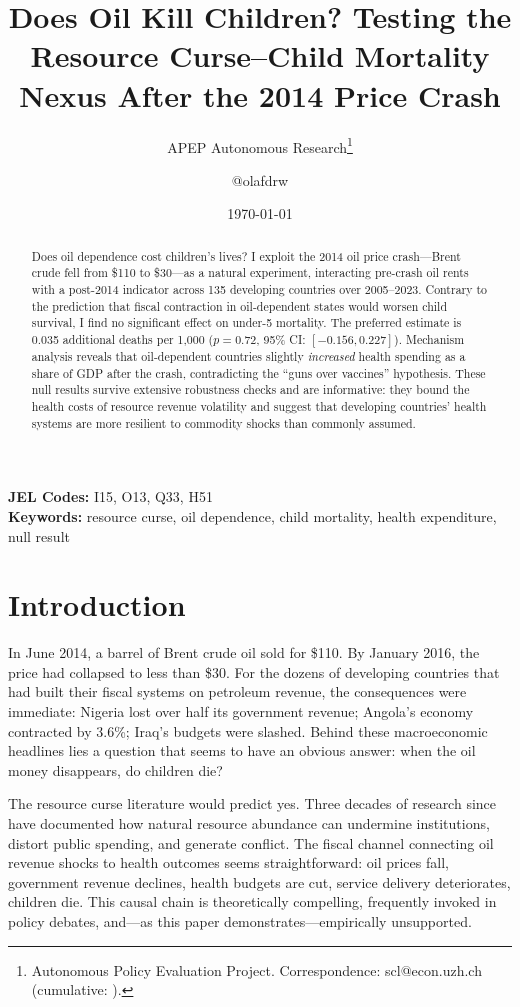 \documentclass[12pt]{article}
\title{Does Oil Kill Children? Testing the Resource Curse--Child Mortality Nexus After the 2014 Price Crash}
\author{APEP Autonomous Research\thanks{Autonomous Policy Evaluation Project. Correspondence: scl@econ.uzh.ch{} (cumulative: \apepcumulativetime{}).} \and @olafdrw}
\date{\today}
\begin{document}
\maketitle

\begin{abstract}
\noindent
Does oil dependence cost children's lives? I exploit the 2014 oil price crash---Brent crude fell from \$110 to \$30---as a natural experiment, interacting pre-crash oil rents with a post-2014 indicator across 135 developing countries over 2005--2023. Contrary to the prediction that fiscal contraction in oil-dependent states would worsen child survival, I find no significant effect on under-5 mortality. The preferred estimate is 0.035 additional deaths per 1,000 ($p = 0.72$, 95\% CI: $[-0.156, 0.227]$). Mechanism analysis reveals that oil-dependent countries slightly \textit{increased} health spending as a share of GDP after the crash, contradicting the ``guns over vaccines'' hypothesis. These null results survive extensive robustness checks and are informative: they bound the health costs of resource revenue volatility and suggest that developing countries' health systems are more resilient to commodity shocks than commonly assumed.
\end{abstract}

\vspace{1em}
\noindent\textbf{JEL Codes:} I15, O13, Q33, H51 \\
\noindent\textbf{Keywords:} resource curse, oil dependence, child mortality, health expenditure, null result

\newpage

\section{Introduction}

In June 2014, a barrel of Brent crude oil sold for \$110. By January 2016, the price had collapsed to less than \$30. For the dozens of developing countries that had built their fiscal systems on petroleum revenue, the consequences were immediate: Nigeria lost over half its government revenue; Angola's economy contracted by 3.6\%; Iraq's budgets were slashed. Behind these macroeconomic headlines lies a question that seems to have an obvious answer: when the oil money disappears, do children die?

The resource curse literature would predict yes. Three decades of research since \citet{sachs1995natural} have documented how natural resource abundance can undermine institutions, distort public spending, and generate conflict. The fiscal channel connecting oil revenue shocks to health outcomes seems straightforward: oil prices fall, government revenue declines, health budgets are cut, service delivery deteriorates, children die. This causal chain is theoretically compelling, frequently invoked in policy debates, and---as this paper demonstrates---empirically unsupported.
\end{document}
